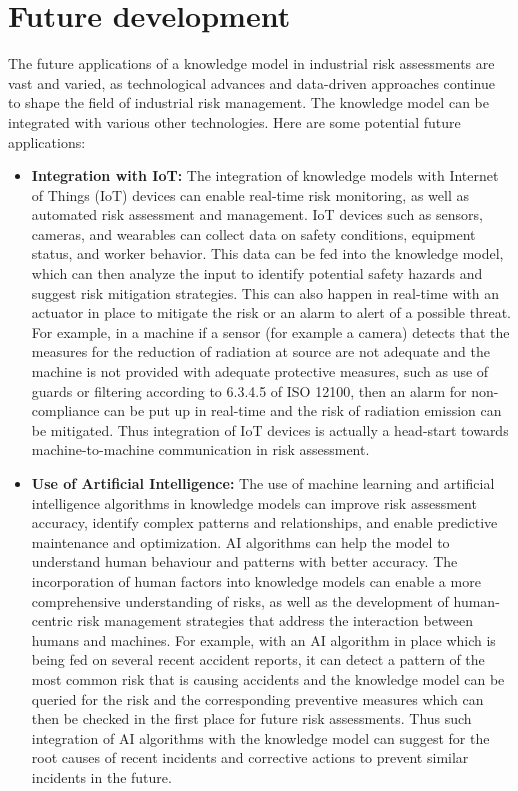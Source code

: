 \section{Future development} \label{future_use}
The future applications of a knowledge model in industrial risk assessments are vast and varied, as technological advances and data-driven approaches continue to shape the field of industrial risk management. The knowledge model can be integrated with various other technologies. Here are some potential future applications:
\begin{itemize}
    \item \textbf{Integration with IoT:} The integration of knowledge models with Internet of Things (IoT) devices can enable real-time risk monitoring, as well as automated risk assessment and management. IoT devices such as sensors, cameras, and wearables can collect data on safety conditions, equipment status, and worker behavior. This data can be fed into the knowledge model, which can then analyze the input to identify potential safety hazards and suggest risk mitigation strategies. This can also happen in real-time with an actuator in place to mitigate the risk or an alarm to alert of a possible threat. For example, in a machine if a sensor (for example a camera) detects that the measures for the reduction of radiation at source are not adequate and the machine is not provided with adequate protective measures, such as use of guards or filtering according to 6.3.4.5 of ISO 12100, then an alarm for non-compliance can be put up in real-time and the risk of radiation emission can be mitigated. Thus integration of IoT devices is actually a head-start towards machine-to-machine communication in risk assessment.
    \item \textbf{Use of Artificial Intelligence:} The use of machine learning and artificial intelligence algorithms in knowledge models can improve risk assessment accuracy, identify complex patterns and relationships, and enable predictive maintenance and optimization. AI algorithms can help the model to understand human behaviour and patterns with better accuracy. The incorporation of human factors into knowledge models can enable a more comprehensive understanding of risks, as well as the development of human-centric risk management strategies that address the interaction between humans and machines. For example, with an AI algorithm in place which is being fed on several recent accident reports, it can detect a pattern of the most common risk that is causing accidents and the knowledge model can be queried for the risk and the corresponding preventive measures which can then be checked in the first place for future risk assessments. Thus such integration of AI algorithms with the knowledge model can suggest for the root causes of recent incidents and corrective actions to prevent similar incidents in the future. 

\end{itemize}
